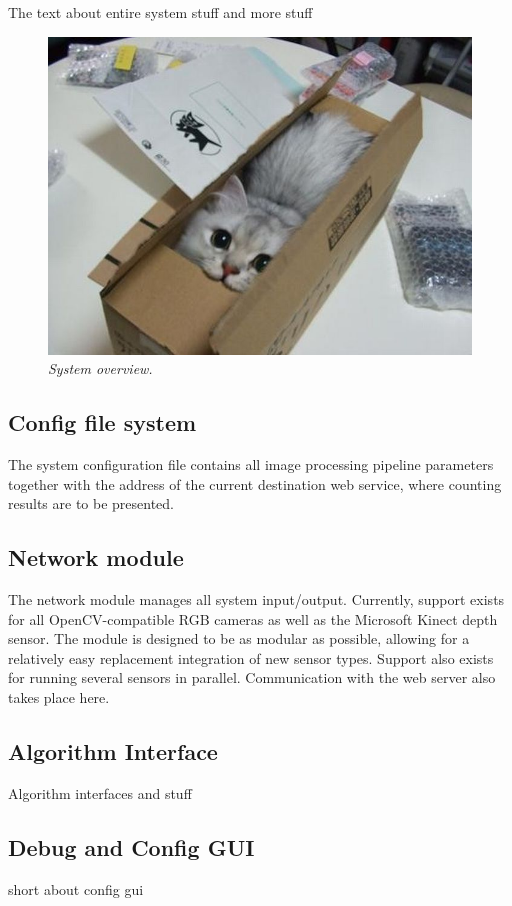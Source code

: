 The text about entire system stuff and more stuff


\begin{figure}[htb]
	\centering
	\includegraphics[width=\linewidth]{images/boxcat.jpg}
	\caption[Overview of the entire system]{\textit{System overview.}}
	\label{fig:system_overview}  %
\end{figure}

\subsection{Config file system}
The system configuration file contains all image processing pipeline parameters together with the address of the current destination web service, where counting results are to be presented.

\subsection{Network module}
The network module manages all system input/output. Currently, support exists for all OpenCV-compatible RGB cameras as well as the Microsoft Kinect depth sensor. The module is designed to be as modular as possible, allowing for a relatively easy replacement integration of new sensor types. Support also exists for running several sensors in parallel. Communication with the web server also takes place here.

\subsection{Algorithm Interface}
Algorithm interfaces and stuff

\subsection{Debug and Config GUI}
short about config gui

